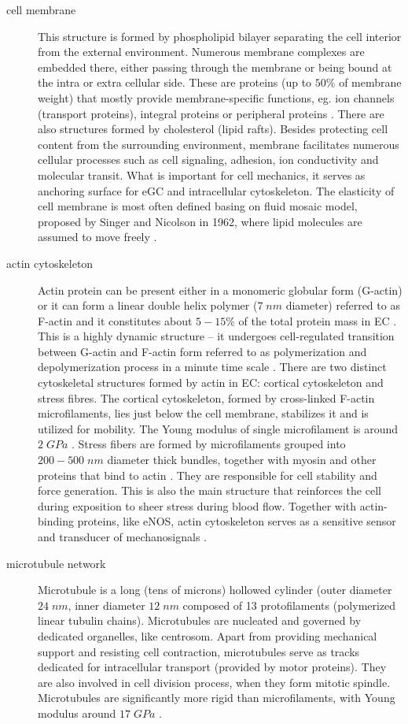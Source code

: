 \begin{description}
\item[cell membrane] This structure is formed by phospholipid bilayer separating the cell interior from the external environment. Numerous membrane complexes are embedded there, either passing through the membrane or being bound at the intra or extra cellular side. These are proteins (up to $50\%$ of membrane weight) that mostly provide membrane-specific functions, eg. ion channels (transport proteins), integral proteins or peripheral proteins \cite{Cooper2000}. There are also structures formed by cholesterol (lipid rafts). Besides protecting cell content from the surrounding environment, membrane facilitates numerous cellular processes such as cell signaling, adhesion, ion conductivity and molecular transit. What is important for cell mechanics, it serves as anchoring surface for \gls{eGC} and intracellular cytoskeleton. The elasticity of cell membrane is most often defined basing on fluid mosaic model, proposed by Singer and Nicolson in 1962, where lipid molecules are assumed to move freely \cite{Singer1972}. 
\item[actin cytoskeleton] Actin protein can be present either in a monomeric globular form (G-actin) or it can form a linear double helix polymer ($7\;nm$ diameter) referred to as F-actin and it constitutes about $5-15\%$ of the total protein mass in \gls{EC} \cite{Patterson2001}. This is a highly dynamic structure -- it undergoes cell-regulated transition between G-actin and F-actin form referred to as polymerization and depolymerization process in a minute time scale \cite{Prasain2009}. There are two distinct cytoskeletal structures formed by actin in \gls{EC}: cortical cytoskeleton and stress fibres. The cortical cytoskeleton, formed by cross-linked F-actin microfilaments, lies just below the cell membrane, stabilizes it and is utilized for mobility. The Young modulus of single microfilament is around $2\;GPa$ \cite{Kojima1994}. Stress fibers are formed by microfilaments grouped into $200-500\;nm$ diameter thick bundles, together with myosin and other proteins that bind to actin \cite{Satcher1996}. They are responsible for cell stability and force generation. This is also the main structure that reinforces the cell during exposition to sheer stress during blood flow. Together with actin-binding proteins, like \gls{eNOS}, actin cytoskeleton serves as a sensitive sensor and transducer of mechanosignals \cite{Shao2014}. 
\item[microtubule network] Microtubule is a long (tens of microns) hollowed cylinder (outer diameter $24\;nm$, inner diameter $12\;nm$ composed of 13 protofilaments (polymerized linear tubulin chains). Microtubules are nucleated and governed by dedicated organelles, like centrosom. Apart from providing mechanical support and resisting cell contraction, microtubules serve as tracks dedicated for intracellular transport (provided by motor proteins). They are also involved in cell division process, when they form mitotic spindle. Microtubules are significantly more rigid than microfilaments, with Young modulus around $17\; GPa$ \cite{Kis2008}.

\end{description}

